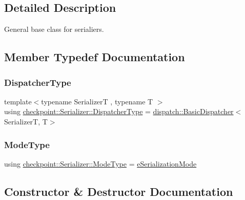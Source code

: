 \subsection{Detailed Description}
General base class for serialiers. 

\subsection{Member Typedef Documentation}
\mbox{\label{structcheckpoint_1_1_serializer_ad8effc5884f1ed37b6b4507422f6d72c}} 
\subsubsection{\texorpdfstring{Dispatcher\+Type}{DispatcherType}}
{\footnotesize\ttfamily template$<$typename SerializerT , typename T $>$ \\
using \hyperlink{structcheckpoint_1_1_serializer_ad8effc5884f1ed37b6b4507422f6d72c}{checkpoint\+::\+Serializer\+::\+Dispatcher\+Type} =  \hyperlink{structcheckpoint_1_1dispatch_1_1_basic_dispatcher}{dispatch\+::\+Basic\+Dispatcher}$<$SerializerT, T$>$}

\mbox{\label{structcheckpoint_1_1_serializer_a4c307e2592dc4224d8a13148109c5764}} 
\subsubsection{\texorpdfstring{Mode\+Type}{ModeType}}
{\footnotesize\ttfamily using \hyperlink{namespacecheckpoint_ae2509499ccd8b1dc48fb535bf8aa3059}{checkpoint\+::\+Serializer\+::\+Mode\+Type} =  \hyperlink{namespacecheckpoint_ae2509499ccd8b1dc48fb535bf8aa3059}{e\+Serialization\+Mode}}



\subsection{Constructor \& Destructor Documentation}
\mbox{\label{structcheckpoint_1_1_serializer_a4007a463384ec96a4c21bd7f049f0be5}} 
